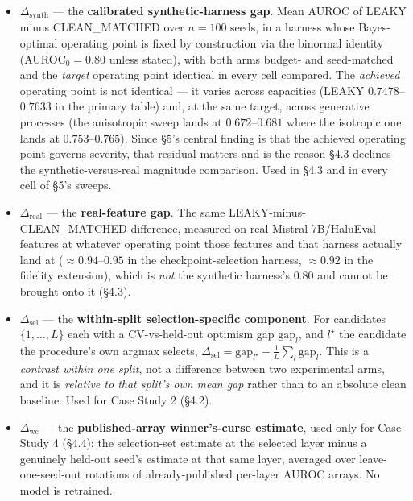 \documentclass[10pt]{article} %
\begin{document}
\begin{itemize}
\item $\Delta_{\text{synth}}$ --- the \textbf{calibrated synthetic-harness
  gap}. Mean AUROC of LEAKY minus CLEAN\_MATCHED over $n=100$ seeds, in a
  harness whose Bayes-optimal operating point is fixed by construction via the
  binormal identity (AUROC$_0=0.80$ unless stated), with both arms budget- and
  seed-matched and the \emph{target} operating point identical in every cell
  compared. The \emph{achieved} operating point is not identical --- it varies
  across capacities (LEAKY $0.7478$--$0.7633$ in the primary table) and, at the
  same target, across generative processes (the anisotropic sweep lands at
  $0.672$--$0.681$ where the isotropic one lands at $0.753$--$0.765$). Since
  §5's central finding is that the achieved operating point governs severity,
  that residual matters and is the reason §4.3 declines the
  synthetic-versus-real magnitude comparison. Used
  in §4.3 and in every cell of §5's sweeps.
\item $\Delta_{\text{real}}$ --- the \textbf{real-feature gap}. The same
  LEAKY-minus-CLEAN\_MATCHED difference, measured on real
  Mistral-7B/HaluEval features at whatever operating point those features
  and that harness actually land at ($\approx0.94$--$0.95$ in the
  checkpoint-selection harness, $\approx0.92$ in the fidelity extension),
  which is \emph{not} the synthetic harness's $0.80$ and cannot be brought
  onto it (§4.3).
\item $\Delta_{\text{sel}}$ --- the \textbf{within-split selection-specific
  component}. For candidates $\{1,\ldots,L\}$ each with a CV-vs-held-out
  optimism gap $\text{gap}_l$, and $l^\star$ the candidate the procedure's
  own argmax selects, $\Delta_{\text{sel}} = \text{gap}_{l^\star} -
  \frac{1}{L}\sum_l \text{gap}_l$. This is a \emph{contrast within one
  split}, not a difference between two experimental arms, and it is
  \emph{relative to that split's own mean gap} rather than to an absolute
  clean baseline. Used for Case Study 2 (§4.2).
\item $\Delta_{\text{wc}}$ --- the \textbf{published-array winner's-curse
  estimate}, used only for Case Study 4 (§4.4): the selection-set estimate
  at the selected layer minus a genuinely held-out seed's estimate at that
  same layer, averaged over leave-one-seed-out rotations of already-published
  per-layer AUROC arrays. No model is retrained.
\end{itemize}
\end{document}
